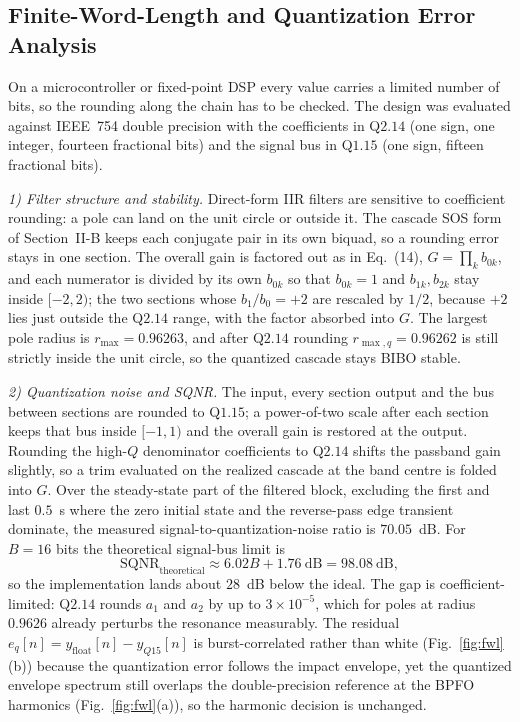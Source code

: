 \subsection{Finite-Word-Length and Quantization Error Analysis}
On a microcontroller or fixed-point DSP every value carries a limited number of
bits, so the rounding along the chain has to be checked. The design was
evaluated against IEEE~754 double precision with the coefficients in Q$2.14$
(one sign, one integer, fourteen fractional bits) and the signal bus in
Q$1.15$ (one sign, fifteen fractional bits).

\emph{1) Filter structure and stability.} Direct-form IIR filters are sensitive
to coefficient rounding: a pole can land on the unit circle or outside it. The
cascade SOS form of Section~II-B keeps each conjugate pair in its own biquad,
so a rounding error stays in one section. The overall gain is factored out as in
Eq.~(14), $G=\prod_k b_{0k}$, and each numerator is divided by its own $b_{0k}$
so that $b_{0k}=1$ and $b_{1k},b_{2k}$ stay inside $[-2,2)$; the two sections
whose $b_1/b_0=+2$ are rescaled by $1/2$, because $+2$ lies just outside the
Q$2.14$ range, with the factor absorbed into $G$. The largest pole radius is
$r_{\max}=0.96263$, and after Q$2.14$ rounding $r_{\max,q}=0.96262$ is still
strictly inside the unit circle, so the quantized cascade stays BIBO stable.

\emph{2) Quantization noise and SQNR.} The input, every section output and the
bus between sections are rounded to Q$1.15$; a power-of-two scale after each
section keeps that bus inside $[-1,1)$ and the overall gain is restored at the
output. Rounding the high-$Q$ denominator coefficients to Q$2.14$ shifts the
passband gain slightly, so a trim evaluated on the realized cascade at the band
centre is folded into $G$. Over the steady-state part of the filtered block,
excluding the first and last $0.5$~s where the zero initial state and the
reverse-pass edge transient dominate, the measured signal-to-quantization-noise
ratio is $70.05$~dB. For $B=16$ bits the theoretical signal-bus limit is
\begin{equation}
  \text{SQNR}_{\text{theoretical}} \approx 6.02B + 1.76~\text{dB}
  = 98.08~\text{dB},
  \label{eq:sqnr}
\end{equation}
so the implementation lands about $28$~dB below the ideal. The gap is
coefficient-limited: Q$2.14$ rounds $a_1$ and $a_2$ by up to $3\times10^{-5}$,
which for poles at radius $0.9626$ already perturbs the resonance measurably.
The residual $e_q[n]=y_{\text{float}}[n]-y_{Q15}[n]$ is burst-correlated rather
than white (Fig.~\ref{fig:fwl}(b)) because the quantization error follows the
impact envelope, yet the quantized envelope spectrum still overlaps the
double-precision reference at the BPFO harmonics (Fig.~\ref{fig:fwl}(a)), so
the harmonic decision is unchanged.

